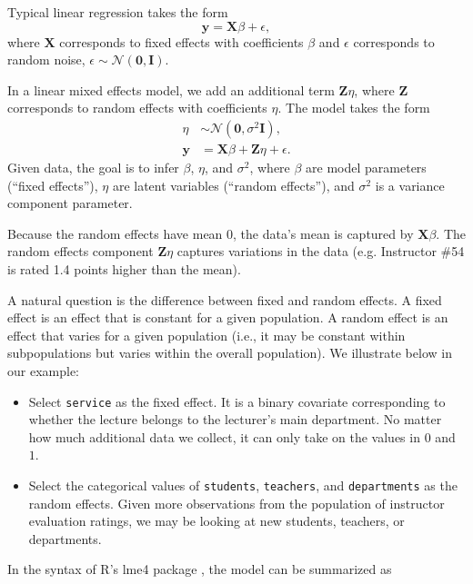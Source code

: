 Typical linear regression takes the form
\begin{equation*}
\mathbf{y} = \mathbf{X}\beta + \epsilon,
\end{equation*}
where $\mathbf{X}$ corresponds to fixed effects with coefficients
$\beta$ and $\epsilon$ corresponds to random noise,
$\epsilon\sim\mathcal{N}(\mathbf{0}, \mathbf{I})$.

In a linear mixed effects model, we add an additional term
$\mathbf{Z}\eta$, where $\mathbf{Z}$ corresponds to random effects
with coefficients $\eta$. The model takes the form
\begin{align*}
\eta &\sim \mathcal{N}(\mathbf{0}, \sigma^2 \mathbf{I}), \\
\mathbf{y} &= \mathbf{X}\beta + \mathbf{Z}\eta + \epsilon.
\end{align*}
Given data, the goal is to infer $\beta$, $\eta$, and $\sigma^2$,
where $\beta$ are model parameters (``fixed effects''), $\eta$ are
latent variables (``random effects''), and $\sigma^2$ is a variance
component parameter.

Because the random effects have mean 0, the data's mean is captured by
$\mathbf{X}\beta$. The random effects component $\mathbf{Z}\eta$
captures variations in the data (e.g.  Instructor \#54 is rated 1.4
points higher than the mean).

A natural question is the difference between fixed and random effects.
A fixed effect is an effect that is constant for a given population. A
random effect is an effect that varies for a given population (i.e.,
it may be constant within subpopulations but varies within the overall
population). We illustrate below in our example:

\begin{itemize}
\item
Select \texttt{service} as the fixed effect. It is a binary covariate
corresponding to whether the lecture belongs to the lecturer's main
department. No matter how much additional data we collect, it
can only take on the values in $0$ and $1$.
\item
Select the categorical values of \texttt{students}, \texttt{teachers},
and \texttt{departments} as the random effects. Given more
observations from the population of instructor evaluation ratings, we
may be looking at new students, teachers, or departments.
\end{itemize}

In the syntax of R's lme4 package \citep{bates2015fitting}, the model
can be summarized as


